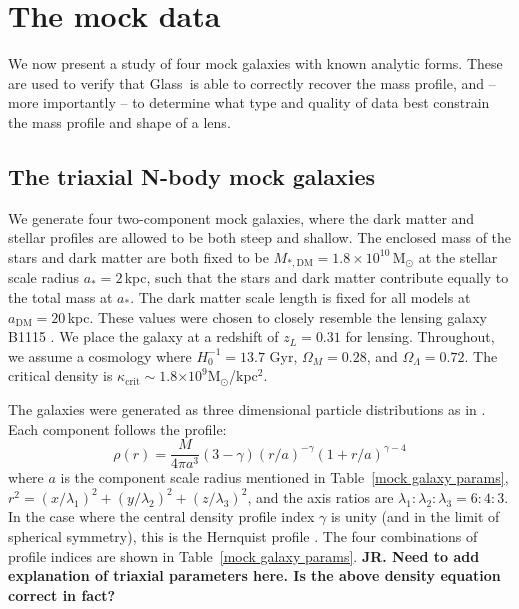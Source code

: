 \documentclass[galley,usenatbib]{mn2e}
\newcommand{\Glass}{{\sc Glass}}
\newcommand{\Msun}{\ensuremath{\mathrm{M}_\odot}}
\newcommand{\tabref}[1] {Table~\ref{#1}}
\newcommand{\e}[1]{\ensuremath{\times 10^{#1}}}
\begin{document}
\section{The mock data}\label{sec:mockdata}

We now present a study of four mock galaxies with known analytic forms. These are used to verify that \Glass\ is able to correctly recover the mass profile, and -- more importantly -- to determine what type and quality of data best constrain the mass profile and shape of a lens.

\subsection{The triaxial N-body mock galaxies}

We generate four two-component mock galaxies, where the dark matter and stellar
profiles are allowed to be both steep and shallow.  
The enclosed mass of the stars and dark matter are both fixed to be 
$M_{*,\mathrm{DM}} = 1.8 \times 10^{10}$\,M$_\odot$ at the stellar scale radius 
$a_* = 2$\,kpc, such that the stars and dark matter contribute equally to the total
mass at $a_*$. The dark matter scale length is fixed for all models at $a_\mathrm{DM}
= 20$\,kpc.
These
values were chosen to closely resemble the lensing galaxy B1115 \citep{1980Natur.285..641W}. We place the galaxy at
a redshift of $z_L = 0.31$ for lensing.  Throughout, we assume a cosmology
where $H_0^{-1}=13.7$ Gyr, $\Omega_M=0.28$, and $\Omega_\Lambda=0.72$. The
critical density is $\kappa_\mathrm{crit}\sim 1.8\e{9}$\Msun/kpc$^2$.


The galaxies were generated as three dimensional particle distributions as in
\citet{2009MNRAS.395.1079D}. Each component follows the profile:
%
\begin{equation} 
  \rho(r) = \frac{M}{4\pi a^3}(3-\gamma){(r/a)^{-\gamma}(1 + r/a)^{\gamma-4}} 
  \label{Dehnen profile} 
\end{equation} 
%
where $a$ is the component scale radius mentioned in \tabref{mock galaxy params},
$r^2 = (x/\lambda_1)^2 + (y/\lambda_2)^2 + (z/\lambda_3)^2$, and the axis
ratios are $\lambda_1:\lambda_2:\lambda_3 = 6:4:3$.
In the case where the central density profile index
$\gamma$ is unity (and in the limit of spherical symmetry), this is the Hernquist
profile \citep{1990ApJ...356..359H}.  The four combinations of profile indices
are shown in \tabref{mock galaxy params}. {\bf JR. Need to add explanation of
triaxial parameters here. Is the above density equation correct in fact?} 
\end{document}
